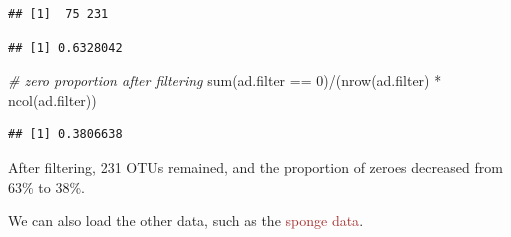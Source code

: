 \documentclass[
]{book}
\newenvironment{Shaded}{\begin{snugshade}}{\end{snugshade}}
\newcommand{\AttributeTok}[1]{\textcolor[rgb]{0.77,0.63,0.00}{#1}}
\newcommand{\CommentTok}[1]{\textcolor[rgb]{0.56,0.35,0.01}{\textit{#1}}}
\newcommand{\DecValTok}[1]{\textcolor[rgb]{0.00,0.00,0.81}{#1}}
\newcommand{\FunctionTok}[1]{\textcolor[rgb]{0.00,0.00,0.00}{#1}}
\newcommand{\NormalTok}[1]{#1}
\newcommand{\OtherTok}[1]{\textcolor[rgb]{0.56,0.35,0.01}{#1}}
\newcommand{\SpecialCharTok}[1]{\textcolor[rgb]{0.00,0.00,0.00}{#1}}
\newcommand{\StringTok}[1]{\textcolor[rgb]{0.31,0.60,0.02}{#1}}
\begin{document}
\begin{Shaded}
\end{Shaded}

\begin{verbatim}
## [1]  75 231
\end{verbatim}

\begin{Shaded}
\end{Shaded}

\begin{verbatim}
## [1] 0.6328042
\end{verbatim}

\begin{Shaded}
\begin{Highlighting}[]
\CommentTok{\# zero proportion after filtering}
\FunctionTok{sum}\NormalTok{(ad.filter }\SpecialCharTok{==} \DecValTok{0}\NormalTok{)}\SpecialCharTok{/}\NormalTok{(}\FunctionTok{nrow}\NormalTok{(ad.filter) }\SpecialCharTok{*} \FunctionTok{ncol}\NormalTok{(ad.filter))}
\end{Highlighting}
\end{Shaded}

\begin{verbatim}
## [1] 0.3806638
\end{verbatim}

After filtering, 231 OTUs remained, and the proportion of zeroes decreased from 63\% to 38\%.

We can also load the other data, such as the \textcolor{brown}{sponge data}.

\begin{Shaded}
\end{Shaded}
\end{document}
